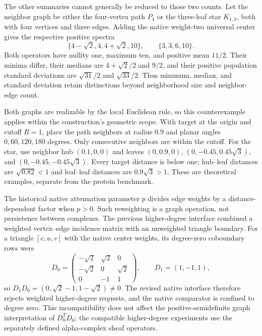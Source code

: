 \documentclass[10pt]{article}
\begin{document}
The other summaries cannot generally be reduced to those two counts. Let the neighbor graph be either the four-vertex path $P_4$ or the three-leaf star $K_{1,3}$, both with four vertices and three edges. Adding the native weight-two universal center gives the respective positive spectra
\begin{equation}
\{4-\sqrt2,4,4+\sqrt2,10\},\qquad \{3,3,6,10\}.
\end{equation}
Both operators have nullity one, maximum ten, and positive mean $11/2$. Their minima differ, their medians are $4+\sqrt2/2$ and $9/2$, and their positive population standard deviations are $\sqrt{31}/2$ and $\sqrt{33}/2$. Thus minimum, median, and standard deviation retain distinctions beyond neighborhood size and neighbor-edge count.

Both graphs are realizable by the local Euclidean rule, so this counterexample applies within the construction's geometric scope. With target at the origin and cutoff $R=1$, place the path neighbors at radius $0.9$ and planar angles $0,60,120,180$ degrees. Only consecutive neighbors are within the cutoff. For the star, use neighbor hub $(0.1,0,0)$ and leaves $(0,0.9,0)$, $(0,-0.45,0.45\sqrt3)$, and $(0,-0.45,-0.45\sqrt3)$. Every target distance is below one; hub--leaf distances are $\sqrt{0.82}<1$ and leaf--leaf distances are $0.9\sqrt3>1$. These are theoretical examples, separate from the protein benchmark.

The historical native attenuation parameter $p$ divides edge weights by a distance-dependent factor when $p>0$. Such reweighting is a graph operation, not persistence between complexes. The previous higher-degree interface combined a weighted vertex--edge incidence matrix with an unweighted triangle boundary. For a triangle $[c,u,v]$ with the native center weights, its degree-zero coboundary rows were
\begin{equation}
D_0=\begin{pmatrix}-\sqrt2&\sqrt2&0\\-\sqrt2&0&\sqrt2\\0&-1&1\end{pmatrix},
\qquad D_1=(1,-1,1),
\end{equation}
so $D_1D_0=(0,\sqrt2-1,1-\sqrt2)\ne0$. The revised native interface therefore rejects weighted higher-degree requests, and the native comparator is confined to degree zero. This incompatibility does not affect the positive-semidefinite graph interpretation of $D_0^TD_0$; the compatible higher-degree experiments use the separately defined alpha-complex sheaf operators.
\end{document}
